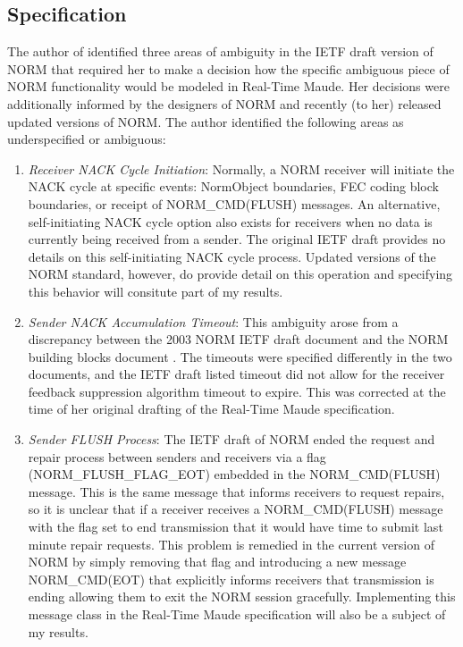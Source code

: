 \documentclass[10pt, journal]{IEEEtran}
\begin{document}
\subsection{Specification}
The author of \cite{Lien2004} identified three areas of ambiguity in the IETF draft version of NORM that required her to make a decision how the specific ambiguous piece of NORM functionality would be modeled in Real-Time Maude. Her decisions were additionally informed by the designers of NORM and recently (to her) released updated versions of NORM. The author identified the following areas as underspecified or ambiguous:
\begin{enumerate}
	\item \textit{Receiver NACK Cycle Initiation}: Normally, a NORM receiver will initiate the NACK cycle at specific events: NormObject boundaries, FEC coding block boundaries, or receipt of NORM\_CMD(FLUSH) messages. An alternative, self-initiating NACK cycle option also exists for receivers when no data is currently being received from a sender. The original IETF draft provides no details on this self-initiating NACK cycle process. Updated versions of the NORM standard, however, do provide detail on this operation and specifying this behavior will consitute part of my results.
	\item \textit{Sender NACK Accumulation Timeout}: This ambiguity arose from a discrepancy between the 2003 NORM IETF draft document and the NORM building blocks document \cite{rfc5401}. The timeouts were specified differently in the two documents, and the IETF draft listed timeout did not allow for the receiver feedback suppression algorithm timeout to expire. This was corrected at the time of her original drafting of the Real-Time Maude specification.
	\item \textit{Sender FLUSH Process}: The IETF draft of NORM ended the request and repair process between senders and receivers via a flag (NORM\_FLUSH\_FLAG\_EOT) embedded in the NORM\_CMD(FLUSH) message. This is the same message that informs receivers to request repairs, so it is unclear that if a receiver receives a NORM\_CMD(FLUSH) message with the flag set to end transmission that it would have time to submit last minute repair requests. This problem is remedied in the current version of NORM by simply removing that flag and introducing a new message NORM\_CMD(EOT) that explicitly informs receivers that transmission is ending allowing them to exit the NORM session gracefully. Implementing this message class in the Real-Time Maude specification will also be a subject of my results.
\end{enumerate}
\end{document}
